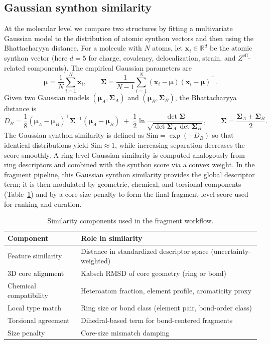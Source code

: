 \documentclass[journal=jctcce,manuscript=article]{achemso}
\begin{document}
\subsection{Gaussian synthon similarity}
At the molecular level we compare two structures by fitting a multivariate Gaussian model to the distribution of atomic synthon vectors and then using the Bhattacharyya distance. For a molecule with $N$ atoms, let $\mathbf{x}_i\in\mathbb{R}^d$ be the atomic synthon vector (here $d=5$ for charge, covalency, delocalization, strain, and $Z^{\mathrm{eff}}$-related components). The empirical Gaussian parameters are
\begin{equation}
\boldsymbol{\mu}=\frac{1}{N}\sum_{i=1}^N \mathbf{x}_i,\qquad
\mathbf{\Sigma}=\frac{1}{N-1}\sum_{i=1}^N (\mathbf{x}_i-\boldsymbol{\mu})(\mathbf{x}_i-\boldsymbol{\mu})^{\!\top}.
\end{equation}
Given two Gaussian models $(\boldsymbol{\mu}_A,\mathbf{\Sigma}_A)$ and $(\boldsymbol{\mu}_B,\mathbf{\Sigma}_B)$, the Bhattacharyya distance is
\begin{equation}
D_B=\frac{1}{8}(\boldsymbol{\mu}_A-\boldsymbol{\mu}_B)^{\!\top}\mathbf{\Sigma}^{-1}(\boldsymbol{\mu}_A-\boldsymbol{\mu}_B)
\;+\;\frac{1}{2}\ln\frac{\det\mathbf{\Sigma}}{\sqrt{\det\mathbf{\Sigma}_A\,\det\mathbf{\Sigma}_B}},
\qquad
\mathbf{\Sigma}=\frac{\mathbf{\Sigma}_A+\mathbf{\Sigma}_B}{2}.
\end{equation}
The Gaussian synthon similarity is defined as $\mathrm{Sim}=\exp(-D_B)$ so that identical distributions yield $\mathrm{Sim}\approx 1$, while increasing separation decreases the score smoothly. A ring-level Gaussian similarity is computed analogously from ring descriptors and combined with the synthon score via a convex weight.
In the fragment pipeline, this Gaussian synthon similarity provides the global descriptor term; it is then modulated by geometric, chemical, and torsional components (Table~\ref{tab:fragment_similarity_terms}) and by a core-size penalty to form the final fragment-level score used for ranking and curation.

\begin{table}[ht]
\caption{Similarity components used in the fragment workflow.}
\label{tab:fragment_similarity_terms}
\centering
\begin{tabular}{ll}
\toprule
Component & Role in similarity \\
\midrule
Feature similarity & Distance in standardized descriptor space (uncertainty-weighted) \\
3D core alignment & Kabsch RMSD of core geometry (ring or bond) \\
Chemical compatibility & Heteroatom fraction, element profile, aromaticity proxy \\
Local type match & Ring size or bond class (element pair, bond-order class) \\
Torsional agreement & Dihedral-based term for bond-centered fragments \\
Size penalty & Core-size mismatch damping \\
\bottomrule
\end{tabular}
\end{table}
\end{document}
